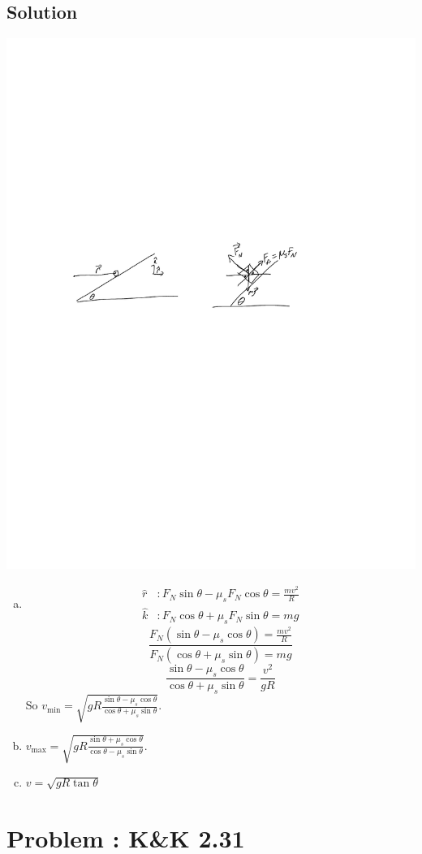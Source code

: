 \documentclass[solutions]{esg8012pset}
\begin{document}
\subsection{Solution}
  \begin{center}\includegraphics[width=.5\textwidth]{2009-10-02_Diagram_4_0}\end{center}
  \begin{enumerate}[a)]
    \item \begin{align*}
    \hat r & : F_N\sin\theta -\mu_s F_N\cos\theta = \frac{m v^2}{R} \\
    \hat k & : F_N\cos\theta +\mu_s F_N\sin\theta = mg
    \end{align*}
    $$\frac{F_N(\sin\theta -\mu_s\cos\theta) = \frac{m v^2}{R}}{F_N(\cos\theta +\mu_s \sin\theta) = mg}$$
    $$\frac{\sin\theta -\mu_s\cos\theta}{\cos\theta +\mu_s \sin\theta} = \frac{v^2}{g R}$$
    So $v_{\text{min}} = \sqrt{g R\frac{\sin\theta -\mu_s\cos\theta}{\cos\theta +\mu_s \sin\theta}}$.
    \item $v_{\text{max}} = \sqrt{g R\frac{\sin\theta +\mu_s\cos\theta}{\cos\theta -\mu_s \sin\theta}}$.
    \item $v = \sqrt{g R\tan\theta}$
  \end{enumerate}
\section{Problem \thesection: K\&K 2.31}
\end{document}
